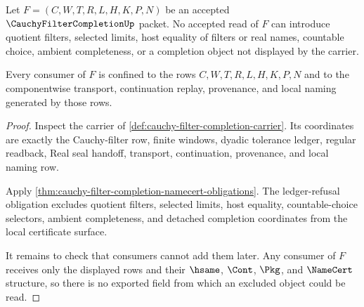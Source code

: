 \begin{theorem}
\label{thm:cauchy-filter-completion-quotient-nonescape}
Let $F=(C,W,T,R,L,H,K,P,N)$ be an accepted $\CauchyFilterCompletionUp$ packet. No accepted read of $F$ can introduce quotient filters, selected limits, host equality of filters or real names, countable choice, ambient completeness, or a completion object not displayed by the carrier.

Every consumer of $F$ is confined to the rows $C,W,T,R,L,H,K,P,N$ and to the componentwise transport, continuation replay, provenance, and local naming generated by those rows.
\end{theorem}
\begin{proof}
Inspect the carrier of \autoref{def:cauchy-filter-completion-carrier}. Its coordinates are exactly the Cauchy-filter row, finite windows, dyadic tolerance ledger, regular readback, Real seal handoff, transport, continuation, provenance, and local naming row.

Apply \autoref{thm:cauchy-filter-completion-namecert-obligations}. The ledger-refusal obligation excludes quotient filters, selected limits, host equality, countable-choice selectors, ambient completeness, and detached completion coordinates from the local certificate surface.

It remains to check that consumers cannot add them later. Any consumer of $F$ receives only the displayed rows and their $\hsame$, $\Cont$, $\Pkg$, and $\NameCert$ structure, so there is no exported field from which an excluded object could be read.
\end{proof}

